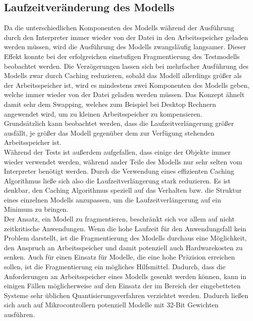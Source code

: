 \subsection{Laufzeitveränderung des Modells}
    Da die unterschiedlichen Komponenten des Modells während der Ausführung durch den Interpreter immer wieder von der Datei in den Arbeitsspeicher geladen werden müssen, wird die Ausführung des Modells zwangsläufig langsamer. Dieser Effekt konnte bei der erfolgreichen einstufigen Fragmentierung des Testmodells beobachtet werden. Die Verzögerungen lassen sich bei mehrfacher Ausführung des Modells zwar durch Caching reduzieren, sobald das Modell allerdings größer als der Arbeitsspeicher ist, wird es mindestens zwei Komponenten des Modells geben, welche immer wieder von der Datei geladen werden müssen. Das Konzept ähnelt damit sehr dem Swapping, welches zum Beispiel bei Desktop Rechnern angewendet wird, um zu kleinen Arbeitsspeicher zu kompensieren.\\ Grundsätzlich kann beobachtet werden, dass die Laufzeitverlängerung größer ausfällt, je größer das Modell gegenüber dem zur Verfügung stehenden Arbeitsspeicher ist.\\ Während der Tests ist außerdem aufgefallen, dass einige der Objekte immer wieder verwendet werden, während ander Teile des Modells nur sehr selten vom Interpreter benötigt werden. Durch die Verwendung eines effizienten Caching Algorithmus ließe sich also die Laufzeitverlängerung stark reduzieren. Es ist denkbar, den Caching Algorithmus speziell auf das Verhalten bzw. die Struktur eines einzelnen Modells anzupassen, um die Laufzeitverlängerung auf ein Minimum zu bringen.\\ Der Ansatz, ein Modell zu fragmentieren, beschränkt sich vor allem auf nicht zeitkritische Anwendungen. Wenn die hohe Laufzeit für den Anwendungsfall kein Problem darstellt, ist die Fragmentierung des Modells durchaus eine Möglichkeit, den Anspruch an Arbeitsspeicher und damit potenziell auch Hardwarekosten zu senken. Auch für einen Einsatz für Modelle, die eine hohe Präzision erreichen sollen, ist die Fragmentierung ein mögliches Hilfsmittel. Dadurch, dass die Anforderungen an Arbeitsspeicher eines Modells gesenkt werden können, kann in einigen Fällen möglicherweise auf den Einsatz der im Bereich der eingebetteten Systeme sehr üblichen Quantisierungsverfahren verzichtet werden. Dadurch ließen sich auch auf Mikrocontrollern potenziell Modelle mit 32-Bit Gewichten ausführen. 

